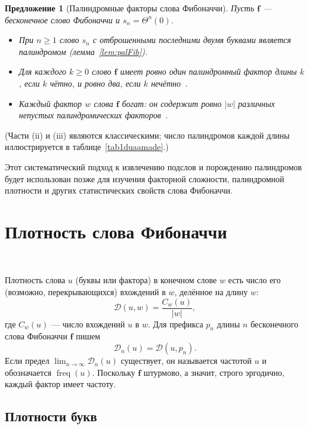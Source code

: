 \documentclass[a4paper,14pt]{extreport}
\theoremstyle{plain}
\newtheorem{proposition}[theorem]{Предложение}
\theoremstyle{definition}
\theoremstyle{remark}
\begin{document}
\begin{proposition}[Палиндромные факторы слова Фибоначчи]
	Пусть $\mathbf f$ --- бесконечное слово Фибоначчи и $s_n=\Theta^n(0)$.
	\begin{itemize}
		\item[(i)] При $n\ge1$ слово $s_n$ с отброшенными последними двумя буквами является палиндромом (лемма~\ref{lem:palFib}).
		\item[(ii)] Для каждого $k\ge0$ слово $\mathbf f$ имеет ровно один палиндромный фактор длины $k$, если $k$ чётно, и ровно два, если $k$ нечётно~\cite{DroubayX}.
		\item[(iii)] Каждый фактор $w$ слова $\mathbf f$ богат: он содержит ровно $|w|$ различных непустых палиндромических факторов~\cite{Droubay}.
	\end{itemize}
\end{proposition}
\noindent (Части (ii) и (iii) являются классическими; число палиндромов каждой длины иллюстрируется в таблице~\ref{tab1duaamade}.)

Этот систематический подход к извлечению подслов и порождению палиндромов будет использован позже для изучения факторной сложности, палиндромной плотности и других статистических свойств слова Фибоначчи.
\section{Плотность слова Фибоначчи}~\label{sec3.4}

Плотность слова $u$ (буквы или фактора) в конечном слове $w$ есть число его
(возможно, перекрывающихся) вхождений в $w$, делённое на длину $w$:
\begin{equation}\label{eq1densityduaa}
	\mathscr{D}(u,w)=\frac{C_w(u)}{|w|},
\end{equation}
где $C_w(u)$ --- число вхождений $u$ в $w$. Для префикса $p_n$ длины $n$ бесконечного
слова Фибоначчи $\mathbf f$ пишем
\begin{equation}\label{eq2densityduaa}
	\mathscr{D}_n(u)=\mathscr{D}(u,p_n).
\end{equation}
Если предел $\lim_{n\to\infty}\mathscr D_n(u)$ существует, он называется частотой $u$ и
обозначается $\operatorname{freq}(u)$. Поскольку $\mathbf f$ штурмово, а значит, строго эргодично, каждый фактор имеет частоту.
\subsection{Плотности букв}~\label{sec3.4.1}
\end{document}
